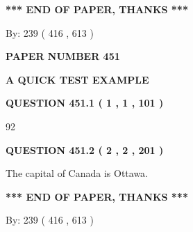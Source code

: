 \documentclass[12pt]{article}
\begin{document}
\vspace{1.0in} 
{\textbf{\large{ *** END OF PAPER, THANKS *** }}} 
   
   
\hspace{1.0in} By: 
 239 ( 416 ,  613 )
   
   
   
   
\newpage 
\setcounter{page}{ 
   451001 } 
   
   
   
   
 {\textbf{ \Large{ PAPER NUMBER  451  }}}
   
   
\vspace{0.2in}
   
   
   
   
   
   
 \vspace{0.2in}
{\LARGE {\textbf{ A QUICK TEST EXAMPLE}}}
   
   
  
\vspace{0.2in}
  
{\textbf{\Large{QUESTION
451.1 
 ( 1 , 1 , 101 )
}}}
  
  
 
 
\noindent{}

92
 
 
  
\vspace{0.2in}
  
{\textbf{\Large{QUESTION
451.2 
 ( 2 , 2 , 201 )
}}}
  
  
 
 
\noindent{}
 
 
The capital of Canada is Ottawa.
 
 
 
 
   
   
 \vspace{0.2in}
 
   
   
   
   
\vspace{1.0in} 
{\textbf{\large{ *** END OF PAPER, THANKS *** }}} 
   
   
\hspace{1.0in} By: 
 239 ( 416 ,  613 )
   
\end{document}
